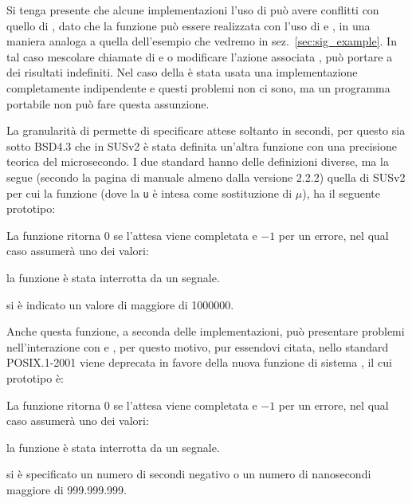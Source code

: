 Si tenga presente che alcune implementazioni l'uso di  può avere
conflitti con quello di , dato che la funzione può essere
realizzata con l'uso di  e , in una maniera analoga a
quella dell'esempio che vedremo in sez.~\ref{sec:sig_example}. In tal caso
mescolare chiamate di  e  o modificare l'azione
associata , può portare a dei risultati indefiniti. Nel caso
della  è stata usata una implementazione completamente indipendente
e questi problemi non ci sono, ma un programma portabile non può fare questa
assunzione.

La granularità di  permette di specificare attese soltanto in
secondi, per questo sia sotto BSD4.3 che in SUSv2 è stata definita un'altra
funzione con una precisione teorica del microsecondo. I due standard hanno
delle definizioni diverse, ma la  segue (secondo la pagina di
manuale almeno dalla versione 2.2.2)  quella di SUSv2 per cui la
funzione  (dove la \texttt{u} è intesa come sostituzione di
$\mu$), ha il seguente prototipo:

\begin{funcproto}{
}

{La funzione ritorna $0$ se l'attesa viene completata e $-1$ per un errore,
  nel qual caso  assumerà uno dei valori:
  \begin{errlist}
  \item[\errcode{EINTR}] la funzione è stata interrotta da un segnale.
  \item[\errcode{EINVAL}] si è indicato un valore di  maggiore di
    1000000.
  \end{errlist}
}
\end{funcproto}

Anche questa funzione, a seconda delle implementazioni, può presentare
problemi nell'interazione con  e , per questo
motivo, pur essendovi citata, nello standard POSIX.1-2001 viene deprecata in
favore della nuova funzione di sistema , il cui prototipo è:

\begin{funcproto}{
}

{La funzione ritorna $0$ se l'attesa viene completata e $-1$ per un errore,
  nel qual caso  assumerà uno dei valori:
  \begin{errlist}
    \item[\errcode{EINTR}] la funzione è stata interrotta da un segnale.
    \item[\errcode{EINVAL}] si è specificato un numero di secondi negativo o un
      numero di nanosecondi maggiore di 999.999.999.
  \end{errlist}
}
\end{funcproto}

